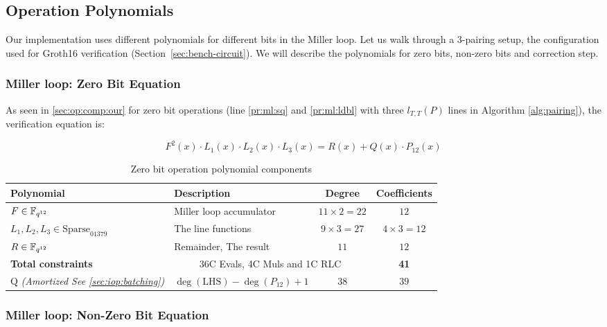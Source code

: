 \subsection{Operation Polynomials}\label{sec:op-polys}

Our implementation uses different polynomials for different bits in the Miller loop. Let us walk through a 3-pairing setup, the configuration used for Groth16 verification (Section~\ref{sec:bench-circuit}). We will describe the polynomials for zero bits, non-zero bits and correction step.

\subsubsection{Miller loop: Zero Bit Equation}\label{sec:op:ml-0bit}

As seen in \ref{sec:op:comp:our} for zero bit operations (line \ref{pr:ml:sq} and \ref{pr:ml:ldbl}  with three $l_{T,T}(P)$ lines in Algorithm \ref{alg:pairing}), the verification equation is:

\begin{equation}\label{eq:op:0b}
F^2(x) \cdot L_1(x) \cdot L_2(x) \cdot L_3(x) = R(x) + Q(x) \cdot P_{12}(x)
\end{equation}

\begin{table}[h]
\centering
\begin{tabular}{|l|l|c|c|}
\hline
\textbf{Polynomial} & \textbf{Description} & \textbf{Degree} & \textbf{Coefficients} \\
\hline
$F \in \mathbb{F}_{q^{12}}$ & Miller loop accumulator & $11 \times 2 = 22$ & $12$ \\
\hline
$L_1, L_2, L_3 \in \text{Sparse}_{01379}$  & The line functions & $9 \times 3 = 27$ & $4 \times 3 = 12$ \\
\hline
$R \in \mathbb{F}_{q^{12}}$ & Remainder, The result & $11$ & $12$ \\
\hline
\textbf{Total constraints} & \multicolumn{2}{|c|}{36C Evals, 4C Muls and 1C RLC} & \textbf{41} \\
\hline
Q \textit{(Amortized See \ref{sec:iop:batching})} & $\deg(\text{LHS}) - \deg(P_{12}) + 1$ & $38$ & $39$ \\
\hline
\end{tabular}
\caption{Zero bit operation polynomial components}\label{tbl:op:ml-0bit}
\end{table}

\subsubsection{Miller loop: Non-Zero Bit Equation}\label{sec:op:ml-nzbit}

